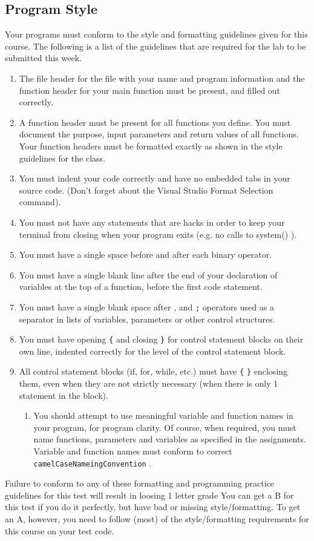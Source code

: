 \documentclass[11pt]{article}
\begin{document}
\subsection*{Program Style}
\label{sec-4-2}


Your programs must conform to the style and formatting guidelines given for this course.
The following is a list of the guidelines that are required for the lab to be submitted
this week.

\begin{enumerate}
\item The file header for the file with your name and program information
  and the function header for your main function must be present, and
  filled out correctly.
\item A function header must be present for all functions you define.
   You must document the purpose, input parameters and return values
   of all functions.  Your function headers must be formatted exactly
   as shown in the style guidelines for the class.
\item You must indent your code correctly and have no embedded tabs in
  your source code. (Don't forget about the Visual Studio Format
  Selection command).
\item You must not have any statements that are hacks in order to keep
   your terminal from closing when your program exits (e.g. no calls
   to system() ).
\item You must have a single space before and after each binary operator.
\item You must have a single blank line after the end of your declaration
  of variables at the top of a function, before the first code
  statement.
\item You must have a single blank space after , and \verb~;~ operators used as a
  separator in lists of variables, parameters or other control
  structures.
\item You must have opening \verb~{~ and closing \verb~}~ for control statement blocks
  on their own line, indented correctly for the level of the control
  statement block.
\item All control statement blocks (if, for, while, etc.) must have \verb~{~
   \verb~}~ enclosing them, even when they are not strictly necessary
   (when there is only 1 statement in the block).
\begin{enumerate}
\item You should attempt to use meaningful variable and function names in
   your program, for program clarity.  Of course, when required, you
   must name functions, parameters and variables as specified in the
   assignments.  Variable and function names must conform to correct
   \verb~camelCaseNameingConvention~ .
\end{enumerate}
\end{enumerate}

Failure to conform to any of these formatting and programming practice
guidelines for this test will result in loosing 1 letter grade You can
get a B for this test if you do it perfectly, but have bad or missing
style/formatting.  To get an A, however, you need to follow (most) of
the style/formatting requirements for this course on your test code.
\end{document}
